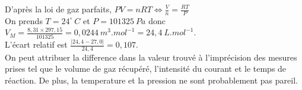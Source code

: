 \documentclass[a4paper, 12pt]{scrartcl}
\newcommand{\mdg}{^{\circ}}
\begin{document}
D'après la loi de gaz parfaits, $PV = nRT \iff \frac{V}{n} = \frac{RT}{P}$ \\
On prends $T = 24\mdg\ \si{C}$ et $P = 101325\ \si{Pa}$ donc \\
$V_M = \frac{8,31 \times 297,15}{101325} = 0,0244 \ \si{m^3.mol^{-1}} = 24,4\ \si{L.mol^{-1}}$.
\\[2mm]
L'écart relatif est $\frac{|24,4-27,0|}{24,4} = 0,107$. \\
On peut attribuer la difference dans la valeur trouvé à l'imprécision des mesures prises tel que le volume de gaz récupéré, 
l'intensité du courant et le temps de réaction. De plus, la temperature et la pression ne sont probablement pas pareil.
\end{document}

